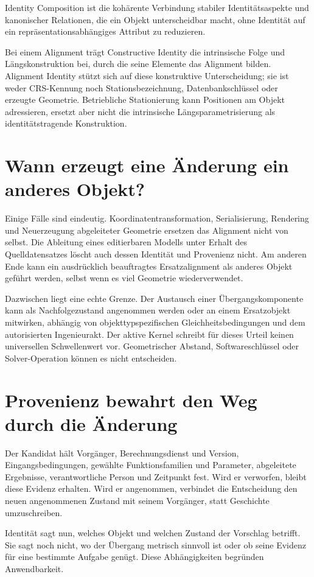 \begin{definition}
\label{def:identity-composition}
Identity Composition ist die kohärente Verbindung stabiler Identitätsaspekte
und kanonischer Relationen, die ein Objekt unterscheidbar macht, ohne Identität
auf ein repräsentationsabhängiges Attribut zu reduzieren.
\end{definition}

Bei einem Alignment trägt Constructive Identity die intrinsische Folge und
Längskonstruktion bei, durch die seine Elemente das Alignment bilden. Alignment
Identity stützt sich auf diese konstruktive Unterscheidung; sie ist weder
CRS-Kennung noch Stationsbezeichnung, Datenbankschlüssel oder erzeugte
Geometrie. Betriebliche Stationierung kann Positionen am Objekt adressieren,
ersetzt aber nicht die intrinsische Längsparametrisierung als
identitätstragende Konstruktion.

\section{Wann erzeugt eine Änderung ein anderes Objekt?}

Einige Fälle sind eindeutig. Koordinatentransformation, Serialisierung,
Rendering und Neuerzeugung abgeleiteter Geometrie ersetzen das Alignment nicht
von selbst. Die Ableitung eines editierbaren Modells unter Erhalt des
Quelldatensatzes löscht auch dessen Identität und Provenienz nicht. Am anderen
Ende kann ein ausdrücklich beauftragtes Ersatzalignment als anderes Objekt
geführt werden, selbst wenn es viel Geometrie wiederverwendet.

Dazwischen liegt eine echte Grenze. Der Austausch einer Übergangskomponente
kann als Nachfolgezustand angenommen werden oder an einem Ersatzobjekt
mitwirken, abhängig von objekttypspezifischen Gleichheitsbedingungen und dem
autorisierten Ingenieurakt. Der aktive Kernel schreibt für dieses Urteil
keinen universellen Schwellenwert vor. Geometrischer Abstand,
Softwareschlüssel oder Solver-Operation können es nicht entscheiden.

\section{Provenienz bewahrt den Weg durch die Änderung}

Der Kandidat hält Vorgänger, Berechnungsdienst und Version,
Eingangsbedingungen, gewählte Funktionsfamilien und Parameter, abgeleitete
Ergebnisse, verantwortliche Person und Zeitpunkt fest. Wird er verworfen,
bleibt diese Evidenz erhalten. Wird er angenommen, verbindet die Entscheidung
den neuen angenommenen Zustand mit seinem Vorgänger, statt Geschichte
umzuschreiben.

Identität sagt nun, welches Objekt und welchen Zustand der Vorschlag betrifft.
Sie sagt noch nicht, wo der Übergang metrisch sinnvoll ist oder ob seine
Evidenz für eine bestimmte Aufgabe genügt. Diese Abhängigkeiten begründen
Anwendbarkeit.
